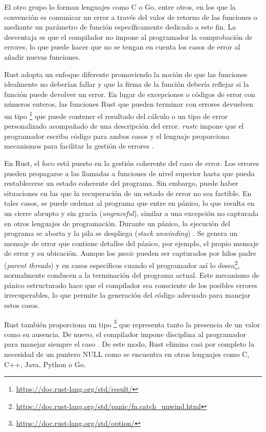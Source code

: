 El otro grupo lo forman lenguajes como C o Go, entre otros, en los que la convención es
comunicar un error a través del valor de retorno de las funciones o mediante un parámetro de
función específicamente dedicado a este fin. La desventaja es que el compilador no impone al
programador la comprobación de errores, lo que puede hacer que no se tengan en cuenta los
casos de error al añadir nuevas funciones.

Rust adopta un enfoque diferente promoviendo la noción de que las funciones idealmente no
deberían fallar y que la firma de la función debería reflejar si la función puede devolver un
error. En lugar de excepciones o códigos de error con números enteros, las funciones Rust que pueden
terminar con errores devuelven un tipo
\footnote{\url{https://doc.rust-lang.org/std/result/}} que puede contener el resultado del
cálculo o un tipo de error personalizado acompañado de una descripción del error.
\emph{rustc} impone que el programador escriba código para ambos casos y
el lenguaje proporciona mecanismos para facilitar la gestión de errores \cite[Chap. 9.2]{rust-book}.

En Rust, el foco está puesto en la gestión coherente del caso de error. Los errores pueden
propagarse a las llamadas a funciones de nivel superior hasta que pueda restablecerse un estado
coherente del programa. Sin embargo, puede haber situaciones en las que la recuperación de un
estado de error no sea factible. En tales casos, se puede ordenar al programa que entre en
pánico, lo que resulta en un cierre abrupto y sin gracia (\textit{ungraceful}),
similar a una excepción no capturada en otros lenguajes de programación.
Durante un pánico, la ejecución del programa se aborta y la
pila se despliega (\textit{stack unwinding}) \cite[Chap. 9.1]{rust-book}.
Se genera un mensaje de error que
contiene detalles del pánico, por ejemplo, el propio mensaje de error y su ubicación.
Aunque los \textit{panic} pueden ser capturados por hilos padre (\textit{parent threads})
y en casos específicos
cuando el programador así lo desea\footnote{\url{https://doc.rust-lang.org/std/panic/fn.catch\_unwind.html}},
normalmente conducen a la terminación del programa actual. Este
mecanismo de pánico estructurado hace que el compilador sea consciente de los posibles
errores irrecuperables, lo que permite la generación del código adecuado para manejar estos
casos.

Rust también proporciona un tipo \footnote{\url{https://doc.rust-lang.org/std/option/}}
que representa tanto la presencia de un valor como su ausencia.
De nuevo, el compilador impone disciplina al programador para manejar
siempre el caso .
De este modo, Rust elimina casi por completo la necesidad de un
puntero NULL como se encuentra en otros lenguajes como C, C++, Java, Python o Go.

